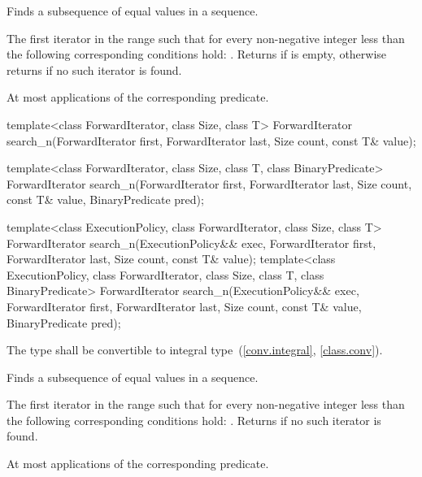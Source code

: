 \begin{itemdescr}
\pnum
\effects
Finds a subsequence of equal values in a sequence.

\pnum
\returns
The first iterator
in the range 
such that for every non-negative integer
less than
the following corresponding conditions hold:
.
Returns 
if  is empty,
otherwise returns 
if no such iterator is found.

\pnum
\complexity
At most
applications of the corresponding predicate.
\end{itemdescr}

%
\begin{itemdecl}
template<class ForwardIterator, class Size, class T>
  ForwardIterator
    search_n(ForwardIterator first, ForwardIterator last, Size count,
             const T& value);

template<class ForwardIterator, class Size, class T,
         class BinaryPredicate>
  ForwardIterator
    search_n(ForwardIterator first, ForwardIterator last, Size count,
             const T& value, BinaryPredicate pred);

template<class ExecutionPolicy, class ForwardIterator, class Size, class T>
  ForwardIterator
    search_n(ExecutionPolicy&& exec,
             ForwardIterator first, ForwardIterator last,
             Size count, const T& value);
template<class ExecutionPolicy, class ForwardIterator, class Size, class T,
         class BinaryPredicate>
  ForwardIterator
    search_n(ExecutionPolicy&& exec,
             ForwardIterator first, ForwardIterator last,
             Size count, const T& value,
             BinaryPredicate pred);
\end{itemdecl}

\begin{itemdescr}
\pnum
\requires
The type
shall be convertible to integral type~(\ref{conv.integral}, \ref{class.conv}).

\pnum
\effects
Finds a subsequence of equal values in a sequence.

\pnum
\returns
The first iterator
in the range 
such that for every non-negative integer
less than
the following corresponding conditions hold:
.
Returns 
if no such iterator is found.

\pnum
\complexity
At most
applications of the corresponding predicate.
\end{itemdescr}

